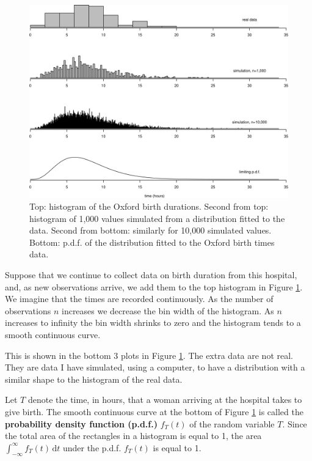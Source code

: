 \documentclass[
  british,
]{book}
\begin{document}
\begin{figure}

{\centering \includegraphics[width=0.8\linewidth]{images/ox_cont_var} 

}

\caption{Top: histogram of the Oxford birth durations. Second from top: histogram of 1,000 values simulated from a distribution fitted to the data. Second from bottom: similarly for 10,000 simulated values. Bottom: p.d.f. of the distribution fitted to the Oxford birth times data.}\label{fig:oxcontvar}
\end{figure}
\FloatBarrier

Suppose that we continue to collect data on birth duration from this hospital, and, as new observations arrive, we add them to the top histogram in Figure \ref{fig:oxcontvar}. We imagine that the times are recorded continuously. As the number of observations \(n\) increases we decrease the bin width of the histogram. As \(n\) increases to infinity the bin width shrinks to zero and the histogram tends to a smooth continuous curve.

This is shown in the bottom 3 plots in Figure \ref{fig:oxcontvar}. The extra data are not real. They are data I have simulated, using a computer, to have a distribution with a similar shape to the histogram of the real data.

Let \(T\) denote the time, in hours, that a woman arriving at the hospital takes to give birth. The smooth continuous curve at the bottom of Figure \ref{fig:oxcontvar} is called the \textbf{probability density function (p.d.f.)} \(f_T(t)\) of the random variable \(T\). Since the total area of the rectangles in a histogram is equal to 1, the area \(\int_{-\infty}^{\infty} f_T(t) \, \mathrm{d}t\) under the p.d.f. \(f_T(t)\) is equal to 1.
\end{document}
